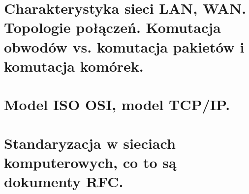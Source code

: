 \documentclass[a4paper]{article}
\begin{document}


    \section{Charakterystyka sieci LAN, WAN. Topologie połączeń. Komutacja obwodów vs. komutacja
    pakietów i komutacja komórek.}
    


    \section{Model ISO OSI, model TCP/IP.}
    


    \section{Standaryzacja w sieciach komputerowych, co to są dokumenty RFC.}
    
\end{document}
